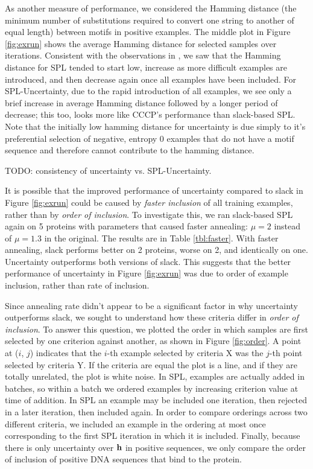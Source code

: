 \documentclass{article}
\begin{document}
As another measure of performance, we considered the Hamming distance (the minimum number of substitutions required to convert one string to another of equal length) between motifs in positive examples. The middle plot in Figure \ref{fig:exrun} shows the average Hamming distance for selected samples over iterations. Consistent with the observations in \cite{SPL}, we saw that the Hamming distance for SPL tended to start low, increase as more difficult examples are introduced, and then decrease again once all examples have been included. For SPL-Uncertainty, due to the rapid introduction of all examples, we see only a brief increase in average Hamming distance followed by a longer period of decrease; this too, looks more like CCCP's performance than slack-based SPL. Note that the initially low hamming distance for uncertainty is due simply to it's preferential selection of negative, entropy 0 examples that do not have a motif sequence and therefore cannot contribute to the hamming distance.

TODO: consistency of uncertainty vs. SPL-Uncertainty.

It is possible that the improved performance of uncertainty compared to slack in Figure \ref{fig:exrun} could be caused by \emph{faster inclusion} of all training examples, rather than by \emph{order of inclusion}.  To investigate this, we ran slack-based SPL again on 5 proteins with parameters that caused faster annealing: $\mu=2$ instead of $\mu=1.3$ in the original.  The results are in Table \ref{tbl:faster}.  With faster annealing, slack performs better on 2 proteins, worse on 2, and identically on one. Uncertainty outperforms both versions of slack.  This suggests that the better performance of uncertainty in Figure \ref{fig:exrun} was due to order of example inclusion, rather than rate of inclusion.

Since annealing rate didn't appear to be a significant factor in why uncertainty outperforms slack, we sought to understand how these criteria differ in \emph{order of inclusion}. To answer this question, we plotted the order in which samples are first selected by one criterion against another, as shown in Figure \ref{fig:order}. A point at ($i$, $j$) indicates that the $i$-th example selected by criteria {\sc X} was the $j$-th point selected by criteria {\sc Y}.  If the criteria are equal the plot is a line, and if they are totally unrelated, the plot is white noise.  In SPL, examples are actually added in batches, so within a batch we ordered examples by increasing criterion value at time of addition.  In SPL an example may be included one iteration, then rejected in a later iteration, then included again.  In order to compare orderings across two different criteria, we included an example in the ordering at most once corresponding to the first SPL iteration in which it is included.  Finally, because there is only uncertainty over $\bf h$ in positive sequences, we only compare the order of inclusion of positive DNA sequences that bind to the protein.
\end{document}
